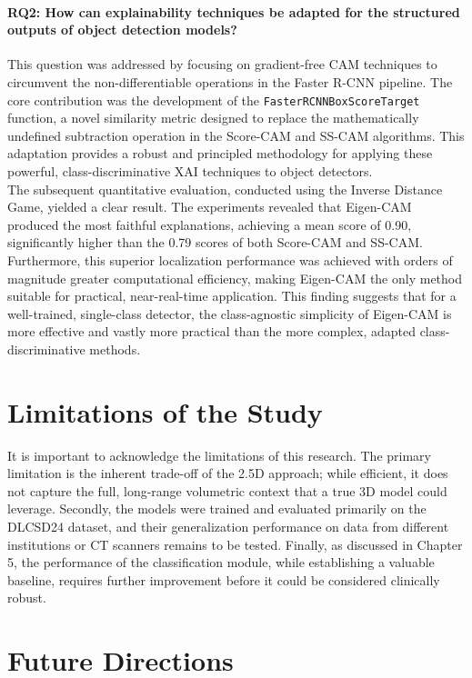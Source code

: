 \paragraph{RQ2: How can explainability techniques be adapted for the structured outputs of object detection models?}
This question was addressed by focusing on gradient-free CAM techniques to circumvent the non-differentiable operations in the Faster R-CNN pipeline. The core contribution was the development of the \texttt{FasterRCNNBoxScoreTarget} function, a novel similarity metric designed to replace the mathematically undefined subtraction operation in the Score-CAM and SS-CAM algorithms. This adaptation provides a robust and principled methodology for applying these powerful, class-discriminative XAI techniques to object detectors.\\


The subsequent quantitative evaluation, conducted using the Inverse Distance Game, yielded a clear result. The experiments revealed that Eigen-CAM produced the most faithful explanations, achieving a mean score of 0.90, significantly higher than the 0.79 scores of both Score-CAM and SS-CAM. Furthermore, this superior localization performance was achieved with orders of magnitude greater computational efficiency, making Eigen-CAM the only method suitable for practical, near-real-time application. This finding suggests that for a well-trained, single-class detector, the class-agnostic simplicity of Eigen-CAM is more effective and vastly more practical than the more complex, adapted class-discriminative methods.

\section{Limitations of the Study}
\label{sec:limitations}

It is important to acknowledge the limitations of this research. The primary limitation is the inherent trade-off of the 2.5D approach; while efficient, it does not capture the full, long-range volumetric context that a true 3D model could leverage. Secondly, the models were trained and evaluated primarily on the DLCSD24 dataset, and their generalization performance on data from different institutions or CT scanners remains to be tested. Finally, as discussed in Chapter 5, the performance of the classification module, while establishing a valuable baseline, requires further improvement before it could be considered clinically robust.

\section{Future Directions}
\label{sec:future_directions}

